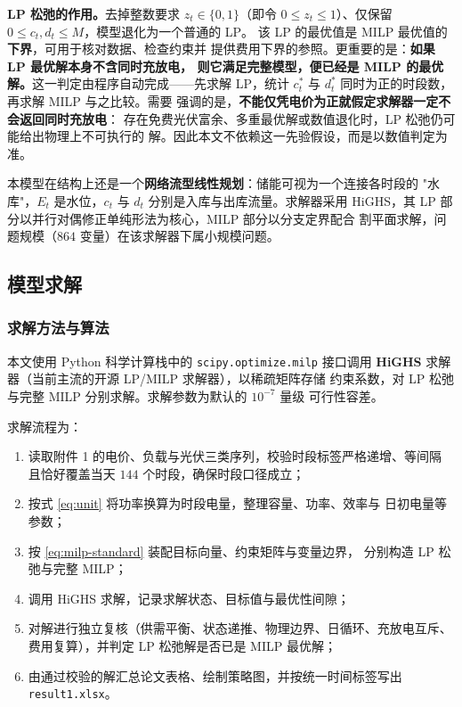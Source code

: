 \documentclass[withoutpreface,bwprint]{cumcmthesis}
\begin{document}
\textbf{LP 松弛的作用。}去掉整数要求 $z_t \in \{0,1\}$（即令
$0 \le z_t \le 1$）、仅保留 $0 \le c_t, d_t \le M$，模型退化为一个普通的 LP。
该 LP 的最优值是 MILP 最优值的\textbf{下界}，可用于核对数据、检查约束并
提供费用下界的参照。更重要的是：\textbf{如果 LP 最优解本身不含同时充放电，
则它满足完整模型，便已经是 MILP 的最优解。}这一判定由程序自动完成——先求解
LP，统计 $c_t^*$ 与 $d_t^*$ 同时为正的时段数，再求解 MILP 与之比较。需要
强调的是，\textbf{不能仅凭电价为正就假定求解器一定不会返回同时充放电}：
存在免费光伏富余、多重最优解或数值退化时，LP 松弛仍可能给出物理上不可执行的
解。因此本文不依赖这一先验假设，而是以数值判定为准。

本模型在结构上还是一个\textbf{网络流型线性规划}：储能可视为一个连接各时段的
"水库"，$E_t$ 是水位，$c_t$ 与 $d_t$ 分别是入库与出库流量。求解器采用
HiGHS，其 LP 部分以并行对偶修正单纯形法为核心，MILP 部分以分支定界配合
割平面求解，问题规模（$864$ 变量）在该求解器下属小规模问题。

\subsection{模型求解}

\subsubsection{求解方法与算法}

本文使用 Python 科学计算栈中的 \texttt{scipy.optimize.milp} 接口调用
\textbf{HiGHS} 求解器（当前主流的开源 LP/MILP 求解器），以稀疏矩阵存储
约束系数，对 LP 松弛与完整 MILP 分别求解。求解参数为默认的 $10^{-7}$ 量级
可行性容差。

求解流程为：

\begin{enumerate}
  \item 读取附件 1 的电价、负载与光伏三类序列，校验时段标签严格递增、等间隔
        且恰好覆盖当天 $144$ 个时段，确保时段口径成立；
  \item 按式 \eqref{eq:unit} 将功率换算为时段电量，整理容量、功率、效率与
        日初电量等参数；
  \item 按 \eqref{eq:milp-standard} 装配目标向量、约束矩阵与变量边界，
        分别构造 LP 松弛与完整 MILP；
  \item 调用 HiGHS 求解，记录求解状态、目标值与最优性间隙；
  \item 对解进行独立复核（供需平衡、状态递推、物理边界、日循环、充放电互斥、
        费用复算），并判定 LP 松弛解是否已是 MILP 最优解；
  \item 由通过校验的解汇总论文表格、绘制策略图，并按统一时间标签写出
        \texttt{result1.xlsx}。
\end{enumerate}
\end{document}
